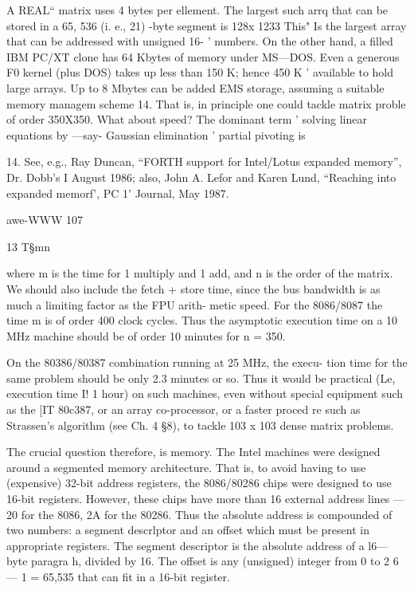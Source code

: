 {A REAL“ matrix uses 4 bytes per ellement. The largest such arrq
that can be stored in a 65, 536 (i. e., 21) -byte segment is 128x 1233
This" Is the largest array that can be addressed with unsigned 16- '
numbers. On the other hand, a filled IBM PC/XT clone has 64
Kbytes of memory under MS—DOS. Even a generous F0
kernel (plus DOS) takes up less than 150 K; hence 450 K '
available to hold large arrays. Up to 8 Mbytes can be added
EMS storage, assuming a suitable memory managem
scheme 14. That is, in principle one could tackle matrix proble
of order 350X350. What about speed? The dominant term '
solving linear equations by —say- Gaussian elimination '
partial pivoting is

 
   
 
 
  
   
 
  
 
 
  

 

14. See, e.g., Ray Duncan, “FORTH support for Intel/Lotus expanded memory”, Dr. Dobb's I
August 1986; also, John A. Lefor and Karen Lund, “Reaching into expanded memorf', PC 1'
Journal, May 1987.

awe-WWW 107

13
T§mn

where m is the time for 1 multiply and 1 add, and n is the order
of the matrix. We should also include the fetch + store time, since
the bus bandwidth is as much a limiting factor as the FPU arith-
metic speed. For the 8086/8087 the time m is of order 400 clock
cycles. Thus the asymptotic execution time on a 10 MHz machine
should be of order 10 minutes for n = 350.

On the 80386/80387 combination running at 25 MHz, the execu-
tion time for the same problem should be only 2.3 minutes or so.
Thus it would be practical (Le, execution time I! 1 hour) on such
machines, even without special equipment such as the [IT 80c387,
or an array co-processor, or a faster proced re such as Strassen’s
algorithm (see Ch. 4 §8), to tackle 103 x 103 dense matrix
problems.

The crucial question therefore, is memory. The Intel machines
were designed around a segmented memory architecture. That is,
to avoid having to use (expensive) 32-bit address registers, the
8086/80286 chips were designed to use 16-bit registers. However,
these chips have more than 16 external address lines — 20 for the
8086, 2A for the 80286. Thus the absolute address is compounded
of two numbers: a segment descrlptor and an offset which
must be present in appropriate registers. The segment descriptor
is the absolute address of a l6—byte paragra h, divided by 16.
The offset is any (unsigned) integer from 0 to 2 6— 1 = 65,535 that
can fit in a 16-bit register.

}
